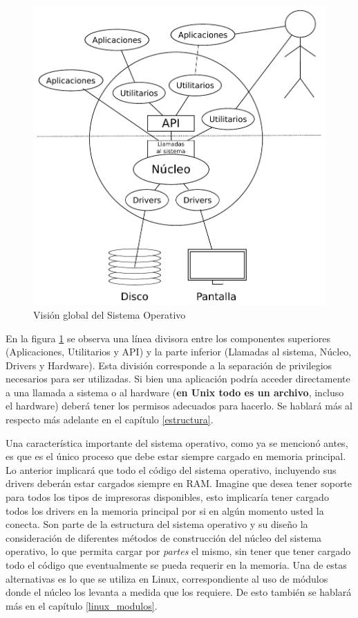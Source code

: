 \begin{figure}[htbp]
\centering
\includegraphics[scale=1.0]{img/C01_introduccion/vision_global.pdf}
\caption{Visión global del Sistema Operativo}
\label{fig:vision_global}
\end{figure}
\FloatBarrier

En la figura \ref{fig:vision_global} se observa una línea divisora entre los
componentes superiores (Aplicaciones, Utilitarios y API) y la parte inferior
(Llamadas al sistema, Núcleo, Drivers y Hardware). Esta división corresponde a
la separación de privilegios necesarios para ser utilizadas. Si bien una
aplicación podría acceder directamente a una llamada a sistema o al hardware
(\textbf{en Unix todo es un archivo}, incluso el hardware) deberá tener los
permisos adecuados para hacerlo. Se hablará más al respecto más adelante en el
capítulo \ref{estructura}.

Una característica importante del sistema operativo, como ya se mencionó antes,
es que es el único proceso que debe estar siempre cargado en memoria principal.
Lo anterior implicará que todo el código del sistema operativo, incluyendo sus
drivers deberán estar cargados siempre en RAM. Imagine que desea tener soporte
para todos los tipos de impresoras disponibles, esto implicaría tener cargado
todos los drivers en la memoria principal por si en algún momento usted la
conecta. Son parte de la estructura del sistema operativo y su diseño la
consideración de diferentes métodos de construcción del núcleo del sistema
operativo, lo que permita cargar por \textit{partes} el mismo, sin tener que
tener cargado todo el código que eventualmente se pueda requerir en la memoria.
Una de estas alternativas es lo que se utiliza en Linux, correspondiente al uso
de módulos donde el núcleo los levanta a medida que los requiere. De esto
también se hablará más en el capítulo \ref{linux_modulos}.

